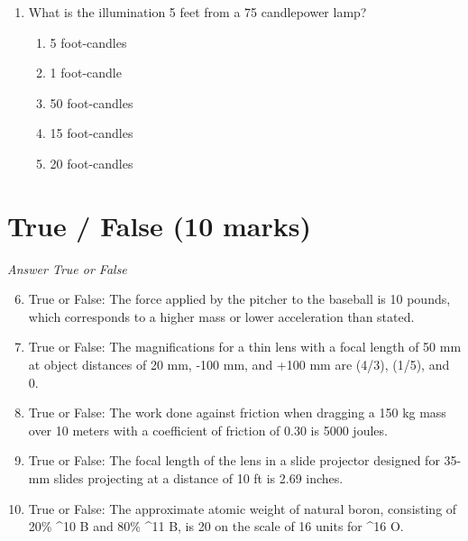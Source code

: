 \documentclass[12pt]{article}
\begin{document}
\begin{enumerate}[label=\arabic*.]
\begin{enumerate}[label=(\alph*)]
    \item 2.65 e-07
    \item 7.10 e-07
    \item 2.30 e-07
    \item 8.45 e-07
    \item 5.67 e-07
\end{enumerate}
\item What is the illumination 5 feet from a 75 candlepower lamp?
\begin{enumerate}[label=(\alph*)]
    \item 5 foot-candles
    \item 1 foot-candle
    \item 50 foot-candles
    \item 15 foot-candles
    \item 20 foot-candles
\end{enumerate}
\end{enumerate}

\section*{True / False (10 marks)}
\textit{Answer True or False}
\begin{enumerate}[label=\arabic*.]
\setcounter{enumi}{5}
\item True or False: The force applied by the pitcher to the baseball is 10 pounds, which corresponds to a higher mass or lower acceleration than stated.
\item True or False: The magnifications for a thin lens with a focal length of 50 mm at object distances of 20 mm, -100 mm, and +100 mm are (4/3), (1/5), and 0.
\item True or False: The work done against friction when dragging a 150 kg mass over 10 meters with a coefficient of friction of 0.30 is 5000 joules.
\item True or False: The focal length of the lens in a slide projector designed for 35-mm slides projecting at a distance of 10 ft is 2.69 inches.
\item True or False: The approximate atomic weight of natural boron, consisting of 20\% ^10 B and 80\% ^11 B, is 20 on the scale of 16 units for ^16 O.
\end{enumerate}
\end{document}
